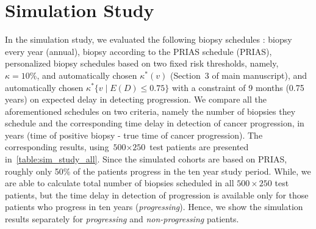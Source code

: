 \section{Simulation Study}
In the simulation study, we evaluated the following biopsy schedules \citep{loeb2014heterogeneity, inoue2018comparative}: biopsy every year (annual), biopsy according to the PRIAS schedule (PRIAS), personalized biopsy schedules based on two fixed risk thresholds, namely, $\kappa=10\%$, and automatically chosen $\kappa^*(v)$ (Section~3 of main manuscript), and automatically chosen ${\kappa^*\{v \mid E(D)\leq 0.75\}}$ with a constraint of 9 months (0.75 years) on expected delay in detecting progression. We compare all the aforementioned schedules on two criteria, namely the number of biopsies they schedule and the corresponding time delay in detection of cancer progression, in years (time of positive biopsy - true time of cancer progression). The corresponding results, using ${\mbox{500} \times \mbox{250}}$ test patients are presented in~\ref{table:sim_study_all}. Since the simulated cohorts are based on PRIAS, roughly only 50\% of the patients progress in the ten year study period. While, we are able to calculate total number of biopsies scheduled in all $500 \times 250$ test patients, but the time delay in detection of progression is available only for those patients who progress in ten years (\textit{progressing}). Hence, we show the simulation results separately for \textit{progressing} and \textit{non-progressing} patients.

